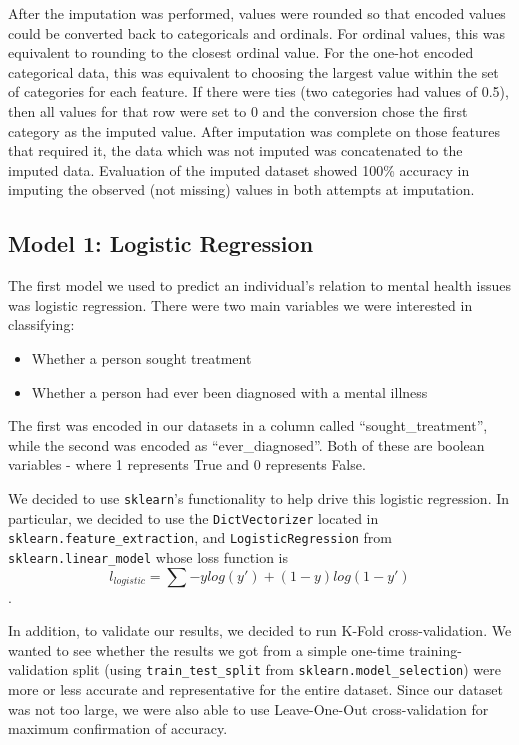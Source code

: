 \documentclass[times, twocolumn]{article}
\begin{document}
After the imputation was performed, values were rounded so that encoded values
could be converted back to categoricals and ordinals. For ordinal values, this
was equivalent to rounding to the closest ordinal value. For the one-hot encoded
categorical data, this was equivalent to choosing the largest value within the
set of categories for each feature. If there were ties (two categories had
values of 0.5), then all values for that row were set to 0 and the conversion
chose the first category as the imputed value. After imputation was complete on
those features that required it, the data which was not imputed was concatenated
to the imputed data. Evaluation of the imputed dataset showed 100\% accuracy in
imputing the observed (not missing) values in both attempts at imputation.


\subsection{Model 1: Logistic Regression}

The first model we used to predict an individual’s relation to mental health
issues was logistic regression. There were two main variables we were
interested in classifying:

\begin{itemize}
    \item Whether a person sought treatment
    \item Whether a person had ever been diagnosed with a mental illness
\end{itemize}

The first was encoded in our datasets in a column called “sought\_treatment”,
while the second was encoded as “ever\_diagnosed”. Both of these are boolean
variables - where 1 represents True and 0 represents False.

We decided to use \texttt{sklearn}’s functionality to help drive this logistic
regression. In particular, we decided to use the \texttt{DictVectorizer} located
in \texttt{sklearn.feature\_extraction}, and \texttt{LogisticRegression} from
\texttt{sklearn.linear\_model} whose loss function is
$$l_{logistic} = \sum -ylog(y') + (1-y)log(1-y')$$.

In addition, to validate our results, we decided to run K-Fold cross-validation.
We wanted to see whether the results we got from a simple one-time
training-validation split (using \texttt{train\_test\_split} from
\texttt{sklearn.model\_selection}) were more or less accurate and representative
for the entire dataset. Since our dataset was not too large, we were also able
to use Leave-One-Out cross-validation for maximum confirmation of accuracy.
\end{document}
